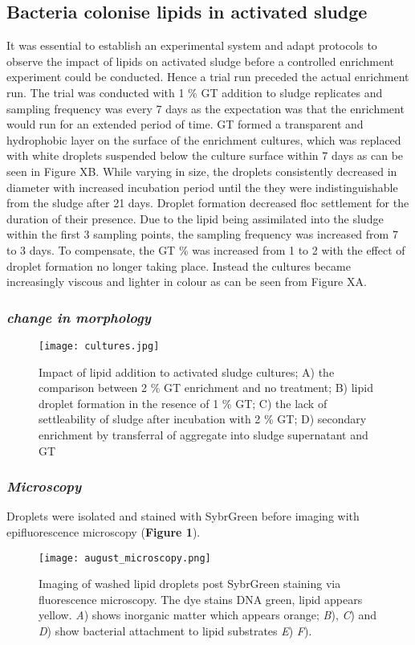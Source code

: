 \documentclass[11pt]{article}
\begin{document}
\subsection{Bacteria colonise lipids in activated sludge}
It was essential to establish an experimental system and adapt protocols to observe the impact of lipids on activated sludge before a controlled enrichment experiment could be conducted. Hence a trial run preceded the actual enrichment run. The trial was conducted with 1 \% GT  addition to sludge replicates and sampling frequency was every 7 days as the expectation was that the enrichment would run for an extended period of time. GT formed a transparent and hydrophobic layer on the surface of the enrichment cultures, which was replaced with white droplets suspended below the culture surface within 7 days as can be seen in Figure XB. While varying in size, the droplets consistently decreased in diameter with increased incubation period until the they were indistinguishable from the sludge after 21 days. Droplet formation decreased floc settlement for the duration of their presence. 
Due to the lipid being assimilated into the sludge within the first 3 sampling points, the sampling frequency was increased from 7 to 3 days. To compensate, the GT \% was increased from 1 to 2 with the effect of droplet formation no longer taking place. Instead the cultures became increasingly viscous and lighter in colour as can be seen from Figure XA. 

\subsubsection{\emph{change in morphology}}
\begin{figure}
\texttt{[image: cultures.jpg]}
\caption{Impact of lipid addition to activated sludge cultures; A) the comparison between 2 \% GT enrichment and no treatment; B) lipid droplet formation in the resence of 1 \% GT; C) the lack of settleability of sludge after incubation with 2 \% GT; D) secondary enrichment by transferral of aggregate into sludge supernatant and GT}
\end{figure}


\subsubsection{\emph{Microscopy}}
 Droplets were isolated and stained with SybrGreen before imaging with epifluorescence microscopy (\textbf{Figure 1}). 

\begin{figure}
\texttt{[image: august\_microscopy.png]}
\caption{Imaging of washed lipid droplets post SybrGreen staining via fluorescence microscopy. The dye stains DNA green, lipid appears yellow. \textit{A}) shows inorganic matter which appears orange; \textit{B}), \textit{C}) and \textit{D}) show bacterial attachment to lipid substrates \textit{E}) \textit{F}).}
\end{figure}
\end{document}
